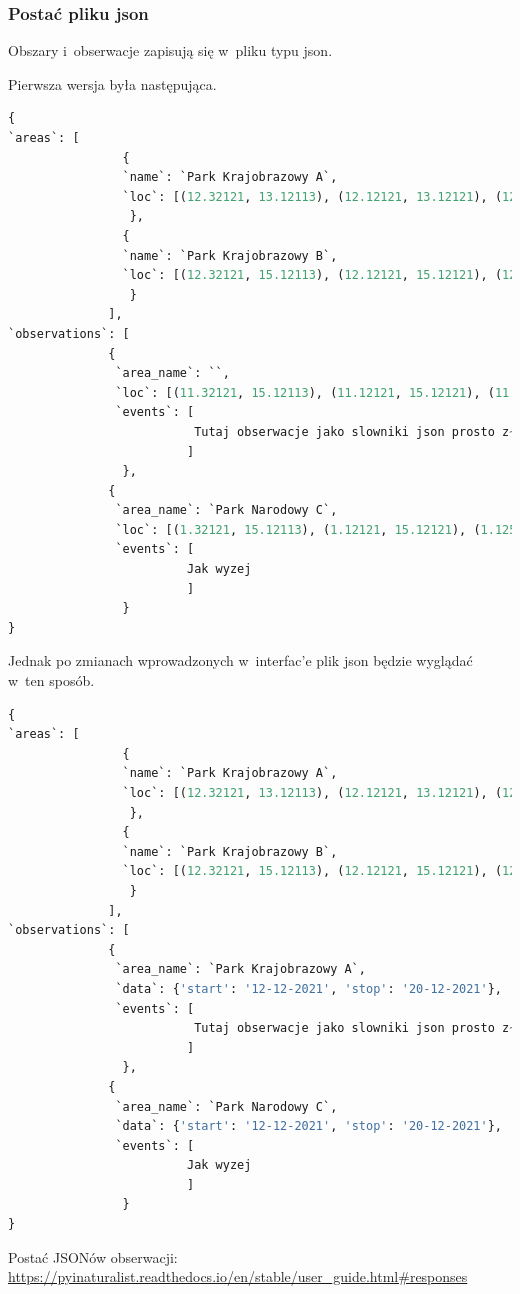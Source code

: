 \documentclass{article}
\begin{document}
\subsubsection{Postać pliku json}
Obszary i~obserwacje zapisują się w~pliku typu json.

Pierwsza wersja była następująca.
\begin{lstlisting}[language=Python, caption=Schemat pliku JSON]
{
`areas`: [
                {
                `name`: `Park Krajobrazowy A`, 
                `loc`: [(12.32121, 13.12113), (12.12121, 13.12121), (12.12521, 13.12151)]
                 },
                {
                `name`: `Park Krajobrazowy B`, 
                `loc`: [(12.32121, 15.12113), (12.12121, 15.12121), (12.12521, 15.12151)]
                 }
              ],
`observations`: [  
              {
               `area_name`: ``,
               `loc`: [(11.32121, 15.12113), (11.12121, 15.12121), (11.12521, 15.12151)],
               `events`: [
                          Tutaj obserwacje jako slowniki json prosto z~bazy pobierane za pomoca funkcji pyinaturalist.get_observations() tak, aby byly konwertowalne za pomoca funkcji pyinaturalist.Observation.from_json_list() 
                         ]
                },
              {
               `area_name`: `Park Narodowy C`,
               `loc`: [(1.32121, 15.12113), (1.12121, 15.12121), (1.12521, 15.12151)],
               `events`: [
                         Jak wyzej
                         ]
                }               
}

\end{lstlisting}
Jednak po zmianach wprowadzonych w~interfac'e plik json będzie wyglądać w~ten sposób.
\begin{lstlisting}[language=Python, caption=Schemat pliku JSON]
{
`areas`: [
                {
                `name`: `Park Krajobrazowy A`, 
                `loc`: [(12.32121, 13.12113), (12.12121, 13.12121), (12.12521, 13.12151)]
                 },
                {
                `name`: `Park Krajobrazowy B`, 
                `loc`: [(12.32121, 15.12113), (12.12121, 15.12121), (12.12521, 15.12151)]
                 }
              ],
`observations`: [  
              {
               `area_name`: `Park Krajobrazowy A`,
               `data`: {'start': '12-12-2021', 'stop': '20-12-2021'},
               `events`: [
                          Tutaj obserwacje jako slowniki json prosto z~bazy pobierane za pomoca funkcji pyinaturalist.get_observations() tak, aby byly konwertowalne za pomoca funkcji pyinaturalist.Observation.from_json_list() 
                         ]
                },
              {
               `area_name`: `Park Narodowy C`,
               `data`: {'start': '12-12-2021', 'stop': '20-12-2021'},
               `events`: [
                         Jak wyzej
                         ]
                }               
}
\end{lstlisting}
Postać JSONów obserwacji:
\url{https://pyinaturalist.readthedocs.io/en/stable/user_guide.html#responses}
 
\end{document}

